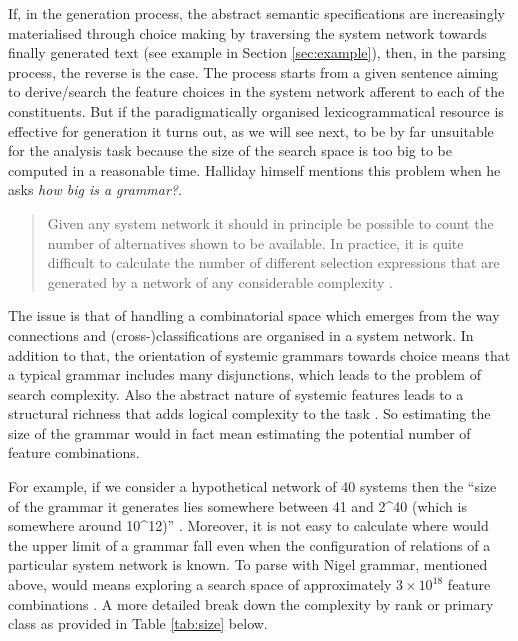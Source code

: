 If, in the generation process, the abstract semantic specifications are increasingly materialised through choice making by traversing the system network towards finally generated text (see example in Section \ref{sec:example}), then, in the parsing process, the reverse is the case. The process starts from a given sentence aiming to derive/search the feature choices in the system network afferent to each of the constituents. But if the paradigmatically organised lexicogrammatical resource is effective for generation it turns out, as we will see next, to be by far unsuitable for the analysis task because the size of the search space is too big to be computed in a reasonable time.
Halliday himself mentions this problem when he asks \textit{how big is a grammar?}.

\begin{quote}
    Given any system network it should in principle be possible to count the number of alternatives shown to be available. In practice, it is quite difficult to calculate the number of different selection expressions that are generated by a network of any considerable complexity \citep[10]{Halliday96-grammatics}.
\end{quote}

The issue is that of handling a combinatorial space which emerges from the way connections and (cross-)classifications are organised in a system network. In addition to that, the orientation of systemic grammars towards choice means that a typical grammar includes many disjunctions, which leads to the problem of search complexity. Also the abstract nature of systemic features leads to a structural richness that adds logical complexity to the task \citep{ODonnell1993}. So estimating the size of the grammar would in fact mean estimating the potential number of feature combinations.

For example, if we consider a hypothetical network of 40 systems then the ``size of the grammar it generates lies somewhere between 41 and 2^{40} (which is somewhere around 10^{12})'' \citep[28]{Bateman2008}. Moreover, it is not easy to calculate where would the upper limit of a grammar fall even when the configuration of relations of a particular system network is known. %
To parse with Nigel grammar, mentioned above, would means exploring a search space of approximately $3 \times 10^{18} $ feature combinations \citep[35]{Bateman2008}. A more detailed break down the complexity by rank or primary class as provided in Table \ref{tab:size} below.

